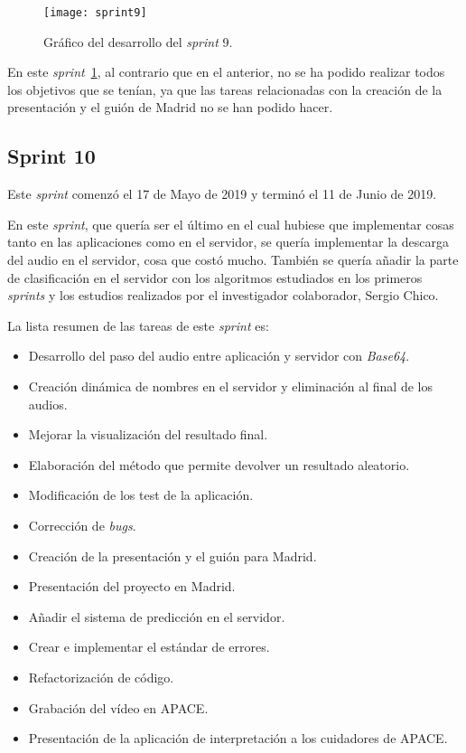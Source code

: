 \begin{figure}
	\centering
	\texttt{[image: sprint9]}
	\caption{Gráfico del desarrollo del \textit{sprint} 9.}
	\label{fig:sprint9}
\end{figure}

En este \textit{sprint}~\ref{fig:sprint9}, al contrario que en el anterior, no se ha podido realizar todos los objetivos que se tenían, ya que las tareas relacionadas con la creación de la presentación y el guión de Madrid no se han podido hacer.

\subsection{Sprint 10}
 Este \textit{sprint} comenzó el 17 de Mayo de 2019 y terminó el 11 de Junio de 2019.
 
 En este \textit{sprint}, que quería ser el último en el cual hubiese que implementar cosas tanto en las aplicaciones como en el servidor, se quería implementar la descarga del audio en el servidor, cosa que costó mucho. También se quería añadir la parte de clasificación en el servidor con los algoritmos estudiados en los primeros \textit{sprints} y los estudios realizados por el investigador colaborador, Sergio Chico.
 
 La lista resumen de las tareas de este \textit{sprint} es:
 \begin{itemize}
 	\item Desarrollo del paso del audio entre aplicación y servidor con \textit{Base64}.
 	\item Creación dinámica de nombres en el servidor y eliminación al final de los audios.
 	\item Mejorar la visualización del resultado final.
 	\item Elaboración del método que permite devolver un resultado aleatorio.
 	\item Modificación de los test de la aplicación.
 	\item Corrección de \textit{bugs}.
 	\item Creación de la presentación y el guión para Madrid.
 	\item Presentación del proyecto en Madrid.
 	\item Añadir el sistema de predicción en el servidor.
 	\item Crear e implementar el estándar de errores.
 	\item Refactorización de código.
 	\item Grabación del vídeo en APACE.
 	\item Presentación de la aplicación de interpretación a los cuidadores de APACE.
 \end{itemize}

